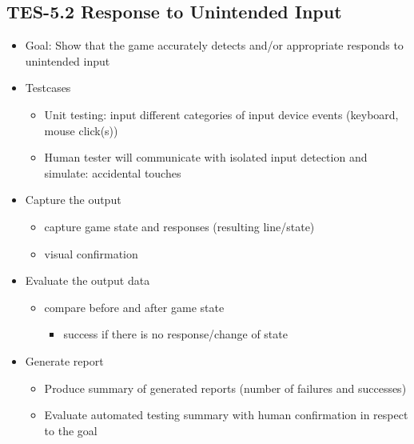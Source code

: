 \subsection{TES-5.2 Response to Unintended Input}
\begin{itemize}
\item Goal: Show that the game accurately detects and/or appropriate responds to unintended input

\item Testcases
\begin{itemize}
\item Unit testing: input different categories of input device events (keyboard, mouse click(s))
\item Human tester will communicate with isolated input detection and simulate: accidental touches
\end{itemize}

\item Capture the output
\begin{itemize}
\item capture game state and responses (resulting line/state)
\item visual confirmation
\end{itemize}

\item Evaluate the output data
\begin{itemize}
\item compare before and after game state
\begin{itemize}
\item success if there is no response/change of state
\end{itemize}
\end{itemize}

\item Generate report
\begin{itemize}
\item Produce summary of generated reports (number of failures and successes)
\item Evaluate automated testing summary with human confirmation in respect to the goal
\end{itemize}
\end{itemize}



